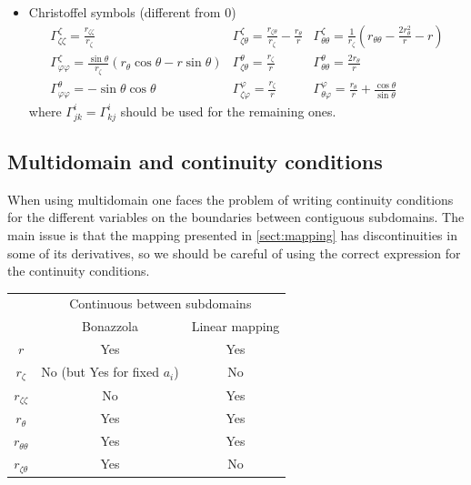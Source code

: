 \begin{itemize}
\item Christoffel symbols (different from 0)
\begin{equation}
\begin{array}{lll}
\displaystyle
\Gamma^{\zeta}_{\zeta\zeta}=\frac{r_{\zeta\zeta}}{r_\zeta}&
\displaystyle
\Gamma^{\zeta}_{\zeta\theta}=
\frac{r_{\zeta\theta}}{r_\zeta}-\frac{r_\theta}{r}&
\displaystyle
\Gamma^{\zeta}_{\theta\theta}=\frac{1}{r_\zeta}\left(r_{\theta\theta}-
\frac{2r_\theta^2}{r}-r\right)\\
\displaystyle
\Gamma^{\zeta}_{\varphi\varphi}=\frac{\sin\theta}{r_\zeta}(r_\theta\cos\theta
-r\sin\theta)&
\displaystyle
\Gamma^{\theta}_{\zeta\theta}=\frac{r_\zeta}{r}&
\displaystyle
\Gamma^{\theta}_{\theta\theta}=\frac{2r_{\theta}}{r}\\
\displaystyle
\Gamma^{\theta}_{\varphi\varphi}=-\sin\theta\cos\theta&
\displaystyle
\Gamma^{\varphi}_{\zeta\varphi}=\frac{r_\zeta}{r}&
\displaystyle
\Gamma^{\varphi}_{\theta\varphi}=\frac{r_\theta}{r}+
\frac{\cos\theta}{\sin\theta}
\end{array}
\end{equation}
where $\Gamma^i_{jk}=\Gamma^i_{kj}$ should be used for the remaining
ones.
\end{itemize}

\subsection{Multidomain and continuity conditions}

When using multidomain one faces the problem of writing continuity
conditions for the different variables on the boundaries between
contiguous subdomains. The main issue is that the mapping presented in
\ref{sect:mapping} has discontinuities in some of its derivatives, so
we should be careful of using the correct expression for the continuity
conditions.

\begin{center}
\begin{tabular}{c|c|c}
& \multicolumn{2}{c}{Continuous between subdomains} \\
& Bonazzola & Linear mapping \\
\hline
$r$ & Yes & Yes\\
$r_\zeta$ & No (but Yes for fixed $a_i$) & No\\
$r_{\zeta\zeta}$ & No & Yes \\
$r_\theta$ & Yes & Yes \\
$r_{\theta\theta}$ & Yes & Yes \\
$r_{\zeta\theta}$ & Yes & No \\
\end{tabular}
\end{center}

